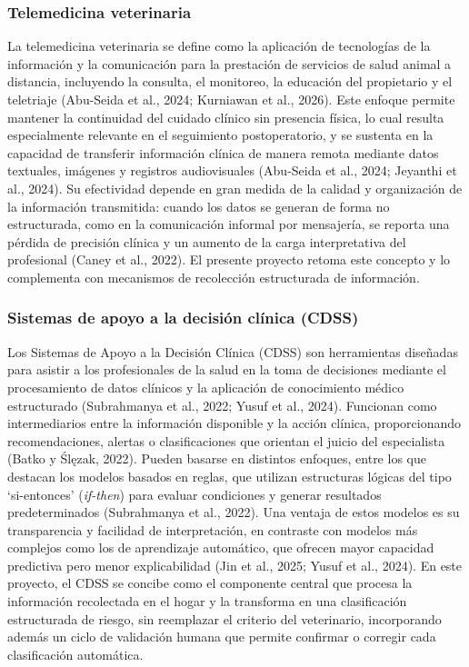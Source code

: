 \documentclass[stu, spanish]{apa7}
\begin{document}
\subsubsection{Telemedicina veterinaria}
La telemedicina veterinaria se define como la aplicaci\'{o}n de tecnolog\'{i}as de la informaci\'{o}n y la comunicaci\'{o}n para la prestaci\'{o}n de servicios de salud animal a distancia, incluyendo la consulta, el monitoreo, la educaci\'{o}n del propietario y el teletriaje (Abu-Seida et al., 2024; Kurniawan et al., 2026). Este enfoque permite mantener la continuidad del cuidado cl\'{i}nico sin presencia f\'{i}sica, lo cual resulta especialmente relevante en el seguimiento postoperatorio, y se sustenta en la capacidad de transferir informaci\'{o}n cl\'{i}nica de manera remota mediante datos textuales, im\'{a}genes y registros audiovisuales (Abu-Seida et al., 2024; Jeyanthi et al., 2024). Su efectividad depende en gran medida de la calidad y organizaci\'{o}n de la informaci\'{o}n transmitida: cuando los datos se generan de forma no estructurada, como en la comunicaci\'{o}n informal por mensajer\'{i}a, se reporta una p\'{e}rdida de precisi\'{o}n cl\'{i}nica y un aumento de la carga interpretativa del profesional (Caney et al., 2022). El presente proyecto retoma este concepto y lo complementa con mecanismos de recolecci\'{o}n estructurada de informaci\'{o}n.

\subsubsection{Sistemas de apoyo a la decisi\'{o}n cl\'{i}nica (CDSS)}
Los Sistemas de Apoyo a la Decisi\'{o}n Cl\'{i}nica (CDSS) son herramientas dise\~{n}adas para asistir a los profesionales de la salud en la toma de decisiones mediante el procesamiento de datos cl\'{i}nicos y la aplicaci\'{o}n de conocimiento m\'{e}dico estructurado (Subrahmanya et al., 2022; Yusuf et al., 2024). Funcionan como intermediarios entre la informaci\'{o}n disponible y la acci\'{o}n cl\'{i}nica, proporcionando recomendaciones, alertas o clasificaciones que orientan el juicio del especialista (Batko y \'{S}l\k{e}zak, 2022). Pueden basarse en distintos enfoques, entre los que destacan los modelos basados en reglas, que utilizan estructuras l\'{o}gicas del tipo \textquoteleft si-entonces\textquoteright{} (\textit{if-then}) para evaluar condiciones y generar resultados predeterminados (Subrahmanya et al., 2022). Una ventaja de estos modelos es su transparencia y facilidad de interpretaci\'{o}n, en contraste con modelos m\'{a}s complejos como los de aprendizaje autom\'{a}tico, que ofrecen mayor capacidad predictiva pero menor explicabilidad (Jin et al., 2025; Yusuf et al., 2024). En este proyecto, el CDSS se concibe como el componente central que procesa la informaci\'{o}n recolectada en el hogar y la transforma en una clasificaci\'{o}n estructurada de riesgo, sin reemplazar el criterio del veterinario, incorporando adem\'{a}s un ciclo de validaci\'{o}n humana que permite confirmar o corregir cada clasificaci\'{o}n autom\'{a}tica.
\end{document}
